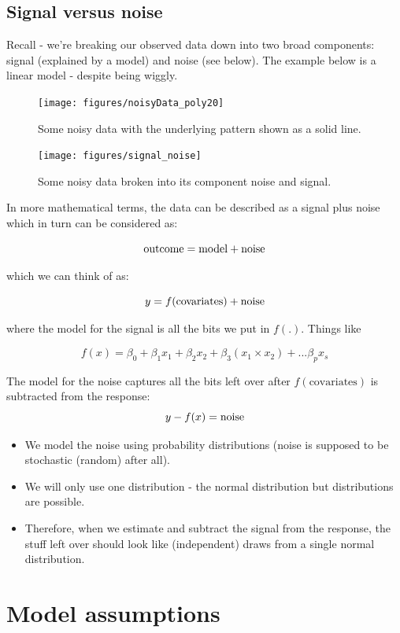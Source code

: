 \documentclass[
  oneside]{krantz}
\providecommand{\tightlist}{%
  \setlength{\itemsep}{0pt}\setlength{\parskip}{0pt}}
\begin{document}
\hypertarget{signal-versus-noise}{%
\subsection{Signal versus noise}\label{signal-versus-noise}}

Recall - we're breaking our observed data down into two broad components: signal (explained by a model) and noise (see below). The example below is a linear model - despite being wiggly.

\begin{figure}[h!]
\centering
\texttt{[image: figures/noisyData\_poly20]}
\caption{Some noisy data with the underlying pattern shown as a solid line.}
\end{figure}

\begin{figure}[h!]
\centering
\texttt{[image: figures/signal\_noise]}
\caption{Some noisy data broken into its component noise and signal.}
\end{figure}

In more mathematical terms, the data can be described as a signal plus noise which in turn can be considered as:

\[{\rm outcome} = {\rm model} + \rm{noise}\]

which we can think of as:

\[y=f({\rm covariates}) + {\rm noise}\]

where the model for the signal is all the bits we put in \(f(.)\). Things like

\[f(x) = \beta_0 + \beta_1x_1 + \beta_2 x_2 + \beta_3(x_1 \times x_2) + ... \beta_p x_s\]

The model for the noise captures all the bits left over after \(f(\textrm{covariates})\) is subtracted from the response:
\[y - f(x) = {\rm noise}\]

\begin{itemize}
\tightlist
\item
  We model the noise using probability distributions (noise is supposed to be stochastic (random) after all).
\item
  We will only use one distribution - the normal distribution but distributions are possible.
\item
  Therefore, when we estimate and subtract the signal from the response, the stuff left over should look like (independent) draws from a single normal distribution.
\end{itemize}

\hypertarget{model-assumptions}{%
\section{Model assumptions}\label{model-assumptions}}
\end{document}
